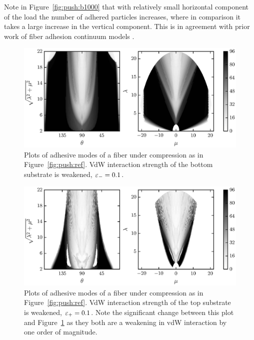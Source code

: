 Note in Figure~\ref{fig:push:b1000} that with relatively small horizontal component of the load the number of adhered particles increases, where in comparison it takes a large increase in the vertical component. This is in agreement with prior work of fiber adhesion continuum models \cite{Majidi2009}.

	\begin{figure}[t]
		\begin{center}
			\includegraphics{./fig/ch3/push/eb0.1/grid.eps}
		\end{center}		
		\caption{Plots of adhesive modes of a fiber under compression as in Figure~\ref{fig:push:ref}. VdW interaction strength of the bottom substrate is weakened, $\varepsilon_-=0.1$.
		\label{fig:push:eb0.1}}
	\end{figure}	

	\begin{figure}[t]
		\begin{center}
			\includegraphics{./fig/ch3/push/et0.1/grid.eps}
		\end{center}		
		\caption{Plots of adhesive modes of a fiber under compression as in Figure~\ref{fig:push:ref}. VdW interaction strength of the top substrate is weakened, $\varepsilon_+=0.1$. Note the significant change between this plot and Figure~\ref{fig:push:eb0.1} as they both are a weakening in vdW interaction by one order of magnitude.
		\label{fig:push:et0.1}}
	\end{figure}

